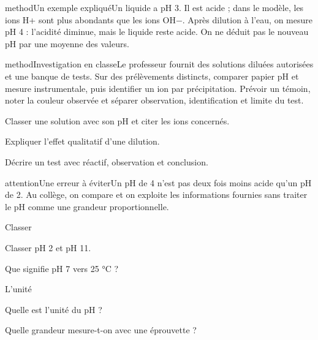 \begin{pcEncadre}{method}{Un exemple expliqué}Un liquide a pH 3. Il est acide ; dans le modèle, les ions H+ sont plus abondants que les ions OH−. Après dilution à l’eau, on mesure pH 4 : l’acidité diminue, mais le liquide reste acide. On ne déduit pas le nouveau pH par une moyenne des valeurs.\end{pcEncadre}
\label{activite-4}
\begin{pcEncadre}{method}{Investigation en classe}Le professeur fournit des solutions diluées autorisées et une banque de tests. Sur des prélèvements distincts, comparer papier pH et mesure instrumentale, puis identifier un ion par précipitation. Prévoir un témoin, noter la couleur observée et séparer observation, identification et limite du test.\end{pcEncadre}
\begin{questions}
\item Classer une solution avec son pH et citer les ions concernés.
\item Expliquer l’effet qualitatif d’une dilution.
\item Décrire un test avec réactif, observation et conclusion.
\end{questions}
\begin{pcEncadre}{attention}{Une erreur à éviter}Un pH de 4 n’est pas deux fois moins acide qu’un pH de 2. Au collège, on compare et on exploite les informations fournies sans traiter le pH comme une grandeur proportionnelle.\end{pcEncadre}
\pcGrille
\clearpage{}
\par\noindent\begin{minipage}{\linewidth}
\begin{exercice}[1]{Classer}
\begin{questions}
\item Classer pH 2 et pH 11.
\item Que signifie pH 7 vers 25 °C ?
\end{questions}
\end{exercice}
\end{minipage}
\par\noindent\begin{minipage}{\linewidth}
\begin{exercice}[1]{L’unité}
\begin{questions}
\item Quelle est l’unité du pH ?
\item Quelle grandeur mesure-t-on avec une éprouvette ?
\end{questions}
\end{exercice}
\end{minipage}

